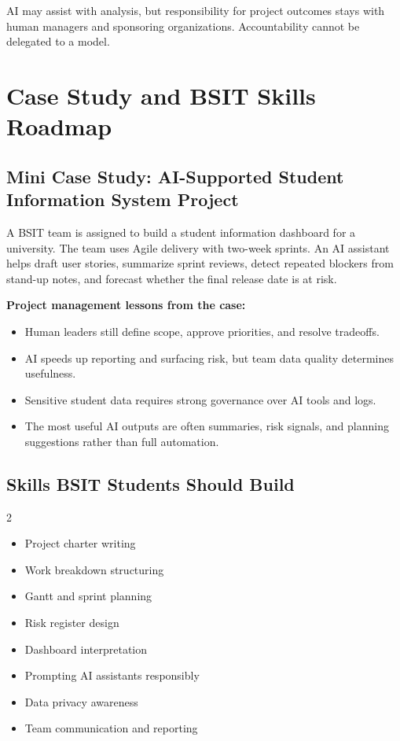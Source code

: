 \documentclass[11pt,a4paper]{article}
\begin{document}
\begin{alertbox}
AI may assist with analysis, but responsibility for project outcomes stays with human managers and sponsoring organizations. Accountability cannot be delegated to a model.
\end{alertbox}

\section{Case Study and BSIT Skills Roadmap}

\subsection{Mini Case Study: AI-Supported Student Information System Project}

\begin{examplebox}[Scenario]
A BSIT team is assigned to build a student information dashboard for a university. The team uses Agile delivery with two-week sprints. An AI assistant helps draft user stories, summarize sprint reviews, detect repeated blockers from stand-up notes, and forecast whether the final release date is at risk.
\end{examplebox}

\textbf{Project management lessons from the case:}
\begin{itemize}[leftmargin=*]
  \item Human leaders still define scope, approve priorities, and resolve tradeoffs.
  \item AI speeds up reporting and surfacing risk, but team data quality determines usefulness.
  \item Sensitive student data requires strong governance over AI tools and logs.
  \item The most useful AI outputs are often summaries, risk signals, and planning suggestions rather than full automation.
\end{itemize}

\subsection{Skills BSIT Students Should Build}

\begin{multicols}{2}
\begin{itemize}[leftmargin=1.2em]
  \item Project charter writing
  \item Work breakdown structuring
  \item Gantt and sprint planning
  \item Risk register design
  \item Dashboard interpretation
  \item Prompting AI assistants responsibly
  \item Data privacy awareness
  \item Team communication and reporting
\end{itemize}
\end{multicols}
\end{document}
